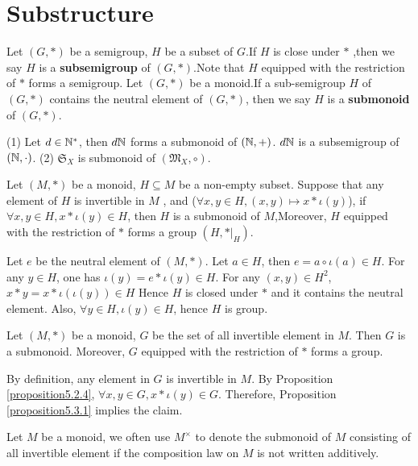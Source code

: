 \documentclass{book}
\numberwithin{equation}{section}
\begin{document}
\section{Substructure}
\begin{definitionenv}
    Let $(G,*)$ be a semigroup, $H$ be a subset of $G$.If $H$ is close under $*$ ,then we say $H$ is a \textbf{subsemigroup} of $(G,*)$.Note that $H$ equipped with the restriction of $*$ forms a semigroup.
    Let $(G,*)$ be a monoid.If a sub-semigroup $H$ of $(G,*)$ contains the neutral element of $(G,*)$, then we say $H$ is a \textbf{submonoid} of $(G,*)$.
\end{definitionenv}
\begin{exampleenv}
   \quad
   \newline
   (1) Let $d\in \mathbb{N}^*$, then $d\mathbb{N}$ forms a submonoid of $(\mathbb{N},+)$.
   $d\mathbb{N}$ is a subsemigroup of $(\mathbb{N},\cdot)$.
    \newline
    (2) $\mathfrak{S} _X$ is submonoid of $(\mathfrak{M} _X,\circ)$.
\end{exampleenv}
\begin{propositionenv}\label{proposition5.3.1}
    Let $(M,*)$ be a monoid, $H\subseteq M$ be a non-empty subset. Suppose that any element of $H$ is invertible in $M$ , and ($\forall x,y \in H,(x,y)\mapsto x*\iota(y)$), if $\forall x,y\in H, x*\iota(y)\in H$, then $H$ is a submonoid of $M$,Moreover, $H$ equipped with the restriction of $*$ forms a group $(H,*|_H)$. 
\end{propositionenv}
\begin{proofenv}
    Let $e$ be the neutral element of $(M,*)$. Let $a\in H$, then $e=a\circ\iota(a)\in H$. For any $y\in H$, one has $\iota(y)=e*\iota(y)\in H$. For any $(x,y)\in H^2$, $x*y=x*\iota(\iota(y))\in H$ Hence $H$ is closed under $*$ and it contains the neutral element. Also, $\forall y\in H, \iota(y)\in H$, hence $H$ is group. 
\end{proofenv}
\begin{corollaryenv}
    Let $(M,*)$ be a monoid, $G$ be the set of all invertible element in $M$. Then $G$ is a submonoid. Moreover, $G$ equipped with the restriction of $*$ forms a group.
\end{corollaryenv}
\begin{proofenv}
    By definition, any element in $G$ is invertible in $M$. By Proposition \ref{proposition5.2.4}, $\forall x,y\in G, x*\iota(y)\in G$. Therefore, Proposition \ref{proposition5.3.1} implies the claim.
\end{proofenv}
\begin{notationenv}
    Let $M$ be a monoid, we often use $M^\times$ to denote the submonoid of $M$ consisting of all invertible element if the composition law on $M$ is not written additively.
\end{notationenv}
\end{document}
